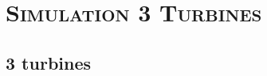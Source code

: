 \documentclass[xcolor=x11names,compress]{beamer}
\renewcommand{\(}{\begin{columns}}
\renewcommand{\)}{\end{columns}}
\newcommand{\<}[1]{\begin{column}{#1}}
\renewcommand{\>}{\end{column}}
\begin{document}
\section{\scshape Simulation 3 Turbines}

\subsection{3 turbines}


\end{document}
